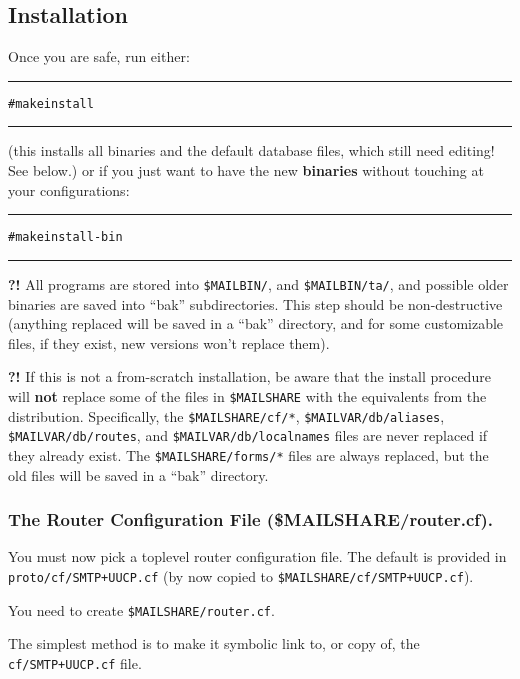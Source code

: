 \begin{multicols}{2}
\subsection{Installation}%

Once you are safe, run either:
\begin{alltt}\medskip\hrule\medskip
  # make install
\medskip\hrule\end{alltt}\medskip

(this installs all binaries and the default database files, which
still need editing! See below.)
or if you just want to have the new {\bf binaries} without touching
at your configurations:
\begin{alltt}\medskip\hrule\medskip
  # make install-bin
\medskip\hrule\end{alltt}\medskip

{\bf\Large ?!}
All programs are stored into  {\tt \$MAILBIN/}, and {\tt \$MAILBIN/ta/}, and
possible older binaries are saved into ``bak'' subdirectories.
This step should be non-destructive (anything replaced will be
saved in a ``bak'' directory, and {\sf for some customizable files, if
they exist, new versions won't replace them}).

{\bf\Large ?!}
If this is not a from-scratch installation, be aware that the install
procedure will {\bf not} replace some of the files in {\tt \$MAILSHARE}
with the equivalents from the distribution.
Specifically, the {\tt \$MAILSHARE/cf/*}, {\tt \$MAILVAR/db/aliases},
{\tt \$MAILVAR/db/routes}, and {\tt \$MAILVAR/db/localnames} files are
never replaced if they already exist.
The {\tt \$MAILSHARE/forms/*} files are always replaced, but the
old files will be saved in a ``bak'' directory.


\subsubsection{The Router Configuration File (\$MAILSHARE/router.cf).}%
%

You must now pick a toplevel router configuration file.  The
default is provided in {\tt proto/cf/SMTP+UUCP.cf} (by now copied to
{\tt \$MAILSHARE/cf/SMTP+UUCP.cf}).

You need to create {\tt \$MAILSHARE/router.cf}.

The simplest method is to make it symbolic link to, or copy of,
the {\tt cf/SMTP+UUCP.cf} file.


\end{multicols}
